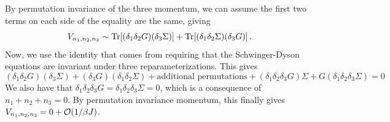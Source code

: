 \documentclass[aps,prx,preprint,onecolumn,citeautoscript,footinbib]{revtex4-1}
\begin{document}
By permutation invariance of the three momentum, we can assume the first two terms on each side of the equality are the same, giving
\begin{equation}
    V_{n_1, n_2, n_3} \sim \Tr[(\delta_1 \delta_2 G) (\delta_3 \Sigma)] + \Tr[(\delta_1 \delta_2 \Sigma) (\delta_3 G)]\,.
    \label{eq:planarReduced}
\end{equation}
Now, we use the identity that comes from requiring that the Schwinger-Dyson equations are invariant under three reparameterizations. This gives
\begin{equation}
   (\delta_1 \delta_2 G)(\delta_3 \Sigma) + (\delta_3 G)(\delta_1 \delta_2 \Sigma) + \text{additional permutations} + (\delta_1 \delta_2 \delta_3 G)\Sigma + G (\delta_1 \delta_2 \delta_3 \Sigma) = 0
   \label{eq:reparamIdentiy}
\end{equation}
We also have that $\delta_1 \delta_2 \delta_3 G = \delta_1 \delta_2 \delta_3 \Sigma = 0$, which is a consequence of $n_1 + n_2 + n_3 = 0$. By permutation invariance momentum, this finally gives $V_{n_1, n_2, n_3} = 0 + \order{1/\beta J}$. 
\end{document}
